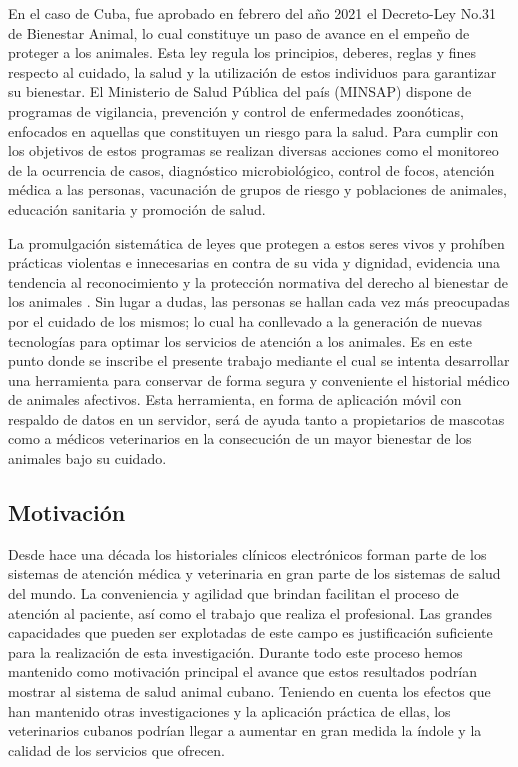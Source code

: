 En el caso de Cuba, fue aprobado en febrero del año 2021 el Decreto-Ley No.31 de Bienestar Animal, lo cual constituye un paso de avance en el empeño de proteger a los animales. Esta ley regula los principios, deberes, reglas y fines respecto al cuidado, la salud y la utilización de estos individuos para garantizar su bienestar. El Ministerio de Salud Pública del país (MINSAP) dispone de programas de vigilancia, prevención y control de enfermedades zoonóticas, enfocados en aquellas que constituyen un riesgo para la salud. Para cumplir con los objetivos de estos programas se realizan diversas acciones como el monitoreo de la ocurrencia de casos, diagnóstico microbiológico, control de focos, atención médica a las personas, vacunación de grupos de riesgo y poblaciones de animales, educación sanitaria y promoción de salud. 

La promulgación sistemática de leyes que protegen a estos seres vivos y prohíben prácticas violentas e innecesarias en contra de su vida y dignidad, evidencia una tendencia al reconocimiento y la protección normativa del derecho al bienestar de los animales . Sin lugar a dudas, las personas se hallan cada vez más preocupadas por el cuidado de los mismos; lo cual ha conllevado a la generación de nuevas tecnologías para optimar los servicios de atención a los animales. Es en este punto donde se inscribe el presente trabajo mediante el cual se intenta desarrollar una herramienta para conservar de forma segura y conveniente el historial médico de animales afectivos. Esta herramienta, en forma de aplicación móvil con respaldo de datos en un servidor, será de ayuda tanto a propietarios de mascotas como a médicos veterinarios en la consecución de un mayor bienestar de los animales bajo su cuidado. 


\subsection*{Motivaci\'on}

Desde hace una d\'ecada los historiales clínicos electr\'onicos forman parte de los sistemas de atenci\'on médica y veterinaria en gran parte de los sistemas de salud del mundo. La conveniencia y agilidad que brindan facilitan el proceso de atenci\'on al paciente, as\'i como el trabajo que realiza el profesional. Las grandes capacidades que pueden ser explotadas de este campo es justificaci\'on suficiente para la realizaci\'on de esta investigaci\'on. Durante todo este proceso hemos mantenido como motivaci\'on principal el avance que estos resultados podr\'ian mostrar al sistema de salud animal cubano. Teniendo en cuenta los efectos que han mantenido otras investigaciones y la aplicaci\'on pr\'actica de ellas, los veterinarios cubanos podr\'ian llegar a aumentar en gran medida la \'indole y la calidad de los servicios que ofrecen.

